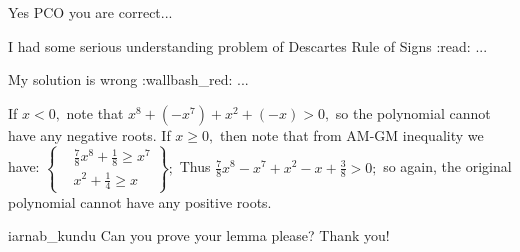 \begin{solution}
	Yes PCO you are correct...

I had some serious understanding problem of Descartes Rule of Signs :read: ...

My solution is wrong :wallbash_red:   ...
\end{solution}



\begin{solution}
	If $x<0,$ note that $x^8+(-x^7)+x^2+(-x)>0,$ so the polynomial cannot have any negative roots.
If $x\geq 0,$ then note that from AM-GM inequality we have:
$\left\{\begin{aligned}& \frac 78 x^8+\frac 18\geq x^7\\& x^2+\frac 14\geq x\end{aligned}\right\} ;$
Thus $\frac 78x^8-x^7+x^2-x+\frac 38>0;$ so again, the original polynomial cannot have any positive roots.
\end{solution}



\begin{solution}
	iarnab_kundu 
Can you prove your lemma please?
Thank you!
\end{solution}



